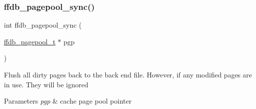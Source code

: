 \subsubsection{\texorpdfstring{ffdb\_pagepool\_sync()}{ffdb\_pagepool\_sync()}}
{\footnotesize\ttfamily int ffdb\+\_\+pagepool\+\_\+sync (\begin{DoxyParamCaption}\item[{\mbox{\hyperlink{adat-devel_2other__libs_2filedb_2filehash_2ffdb__pagepool_8h_a73290f737b0e5f8be90a0fa96ddf6ab6}{ffdb\+\_\+pagepool\+\_\+t}} $\ast$}]{pgp }\end{DoxyParamCaption})}

Flush all dirty pages back to the back end file. However, if any modified pages are in use. They will be ignored


\begin{DoxyParams}{Parameters}
{\em pgp} & cache page pool pointer \\
\hline
\end{DoxyParams}
